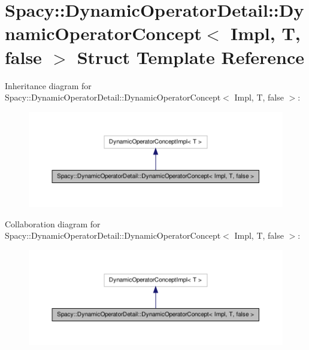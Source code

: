 \hypertarget{structSpacy_1_1DynamicOperatorDetail_1_1DynamicOperatorConcept_3_01Impl_00_01T_00_01false_01_4}{\section{\-Spacy\-:\-:\-Dynamic\-Operator\-Detail\-:\-:\-Dynamic\-Operator\-Concept$<$ \-Impl, \-T, false $>$ \-Struct \-Template \-Reference}
\label{structSpacy_1_1DynamicOperatorDetail_1_1DynamicOperatorConcept_3_01Impl_00_01T_00_01false_01_4}
}


\-Inheritance diagram for \-Spacy\-:\-:\-Dynamic\-Operator\-Detail\-:\-:\-Dynamic\-Operator\-Concept$<$ \-Impl, \-T, false $>$\-:
\nopagebreak
\begin{figure}[H]
\begin{center}
\leavevmode
\includegraphics[width=350pt]{structSpacy_1_1DynamicOperatorDetail_1_1DynamicOperatorConcept_3_01Impl_00_01T_00_01false_01_4__inherit__graph}
\end{center}
\end{figure}


\-Collaboration diagram for \-Spacy\-:\-:\-Dynamic\-Operator\-Detail\-:\-:\-Dynamic\-Operator\-Concept$<$ \-Impl, \-T, false $>$\-:
\nopagebreak
\begin{figure}[H]
\begin{center}
\leavevmode
\includegraphics[width=350pt]{structSpacy_1_1DynamicOperatorDetail_1_1DynamicOperatorConcept_3_01Impl_00_01T_00_01false_01_4__coll__graph}
\end{center}
\end{figure}
